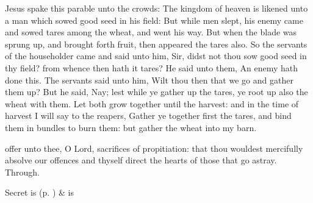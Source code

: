 


\vspace{-0.25\baselineskip}

 Jesus spake this parable unto the crowds: The kingdom of heaven is likened unto a man which sowed good seed in his field: But while men slept, his enemy came and sowed tares among the wheat, and went his way. But when the blade was sprung up, and brought forth fruit, then appeared the tares also. So the servants of the householder came and said unto him, Sir, didst not thou sow good seed in thy field? from whence then hath it tares? He said unto them, An enemy hath done this. The servants said unto him, Wilt thou then that we go and gather them up? But he said, Nay; lest while ye gather up the tares, ye root up also the wheat with them. Let both grow together until the harvest: and in the time of harvest I will say to the reapers, Gather ye together first the tares, and bind them in bundles to burn them: but gather the wheat into my barn.


\vspace{-0.25\baselineskip}

\secret\label{EpiphanyVSecret}
 offer unto thee, O Lord, sacrifices of propitiation: that thou wouldest mercifully absolve our offences and thyself direct the hearts of those that go astray. Through.
\begin{rubric}
     Secret is  (p. \pageref{SPSaints}) \&  is 
\end{rubric}

\vspace{-0.25\baselineskip}


